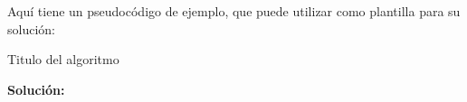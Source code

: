 \documentclass[letterpaper,10pt]{article}
\begin{document}
\begin{enumerate}
Aquí tiene un pseudocódigo de ejemplo, que puede utilizar como plantilla para su solución:

\begin{center}
\begin{minipage}{0.6\textwidth}
\begin{algorithm}[H] %
\begin{algorithmic}[1]%

\ENDFOR
{}
\ENDWHILE


\end{algorithmic}
\caption{Titulo del algoritmo} %
\label{alg:oculto} %
\end{algorithm}
\end{minipage}
\end{center}

\textbf{Solución:}
\end{enumerate}

\newpage
\end{document}
